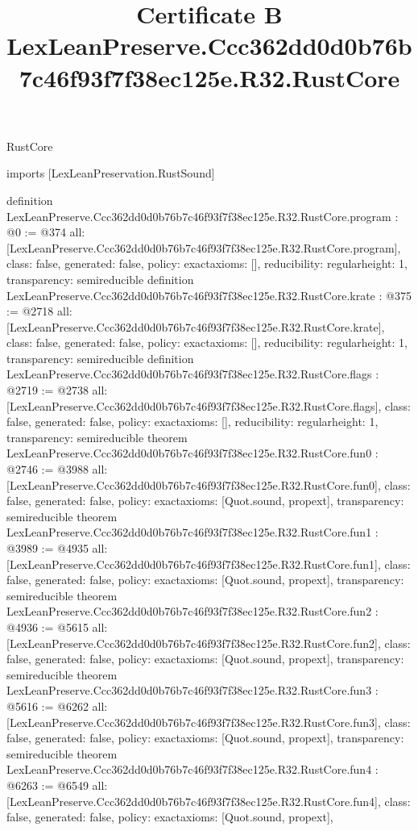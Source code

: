 \begin{lexlean}{RustCore}
\title{Certificate B LexLeanPreserve.Ccc362dd0d0b76b7c46f93f7f38ec125e.R32.RustCore}
\begin{coremodule}
imports [LexLeanPreservation.RustSound]

definition LexLeanPreserve.Ccc362dd0d0b76b7c46f93f7f38ec125e.R32.RustCore.program : @0 := @374 {
  all: [LexLeanPreserve.Ccc362dd0d0b76b7c46f93f7f38ec125e.R32.RustCore.program],
  class: false,
  generated: false,
  policy: exact{axioms: []},
  reducibility: regular{height: 1},
  transparency: semireducible
}
definition LexLeanPreserve.Ccc362dd0d0b76b7c46f93f7f38ec125e.R32.RustCore.krate : @375 := @2718 {
  all: [LexLeanPreserve.Ccc362dd0d0b76b7c46f93f7f38ec125e.R32.RustCore.krate],
  class: false,
  generated: false,
  policy: exact{axioms: []},
  reducibility: regular{height: 1},
  transparency: semireducible
}
definition LexLeanPreserve.Ccc362dd0d0b76b7c46f93f7f38ec125e.R32.RustCore.flags : @2719 := @2738 {
  all: [LexLeanPreserve.Ccc362dd0d0b76b7c46f93f7f38ec125e.R32.RustCore.flags],
  class: false,
  generated: false,
  policy: exact{axioms: []},
  reducibility: regular{height: 1},
  transparency: semireducible
}
theorem LexLeanPreserve.Ccc362dd0d0b76b7c46f93f7f38ec125e.R32.RustCore.fun0 : @2746 := @3988 {
  all: [LexLeanPreserve.Ccc362dd0d0b76b7c46f93f7f38ec125e.R32.RustCore.fun0],
  class: false,
  generated: false,
  policy: exact{axioms: [Quot.sound, propext]},
  transparency: semireducible
}
theorem LexLeanPreserve.Ccc362dd0d0b76b7c46f93f7f38ec125e.R32.RustCore.fun1 : @3989 := @4935 {
  all: [LexLeanPreserve.Ccc362dd0d0b76b7c46f93f7f38ec125e.R32.RustCore.fun1],
  class: false,
  generated: false,
  policy: exact{axioms: [Quot.sound, propext]},
  transparency: semireducible
}
theorem LexLeanPreserve.Ccc362dd0d0b76b7c46f93f7f38ec125e.R32.RustCore.fun2 : @4936 := @5615 {
  all: [LexLeanPreserve.Ccc362dd0d0b76b7c46f93f7f38ec125e.R32.RustCore.fun2],
  class: false,
  generated: false,
  policy: exact{axioms: [Quot.sound, propext]},
  transparency: semireducible
}
theorem LexLeanPreserve.Ccc362dd0d0b76b7c46f93f7f38ec125e.R32.RustCore.fun3 : @5616 := @6262 {
  all: [LexLeanPreserve.Ccc362dd0d0b76b7c46f93f7f38ec125e.R32.RustCore.fun3],
  class: false,
  generated: false,
  policy: exact{axioms: [Quot.sound, propext]},
  transparency: semireducible
}
theorem LexLeanPreserve.Ccc362dd0d0b76b7c46f93f7f38ec125e.R32.RustCore.fun4 : @6263 := @6549 {
  all: [LexLeanPreserve.Ccc362dd0d0b76b7c46f93f7f38ec125e.R32.RustCore.fun4],
  class: false,
  generated: false,
  policy: exact{axioms: [Quot.sound, propext]},
}
\end{coremodule}
\end{lexlean}
